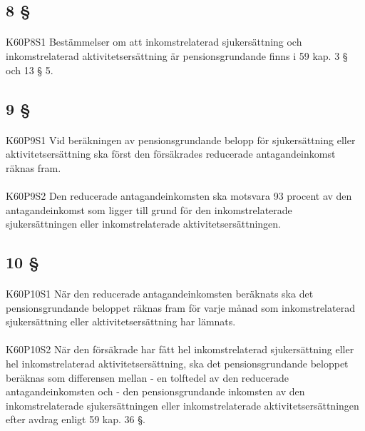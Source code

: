 \documentclass[a4paper,notitlepage,openany,10pt]{book}
\begin{document}
\subsection*{8 §}
\paragraph*{}
{\tiny K60P8S1}
Bestämmelser om att inkomstrelaterad sjukersättning och inkomstrelaterad aktivitetsersättning är pensionsgrundande finns i 59 kap. 3 § och 13 § 5.
\subsection*{9 §}
\paragraph*{}
{\tiny K60P9S1}
Vid beräkningen av pensionsgrundande belopp för sjukersättning eller aktivitetsersättning ska först den försäkrades reducerade antagandeinkomst räknas fram.
\paragraph*{}
{\tiny K60P9S2}
Den reducerade antagandeinkomsten ska motsvara 93 procent av den antagandeinkomst som ligger till grund för den inkomstrelaterade sjukersättningen eller inkomstrelaterade aktivitetsersättningen.
\subsection*{10 §}
\paragraph*{}
{\tiny K60P10S1}
När den reducerade antagandeinkomsten beräknats ska det pensionsgrundande beloppet räknas fram för varje månad som inkomstrelaterad sjukersättning eller aktivitetsersättning har lämnats.
\paragraph*{}
{\tiny K60P10S2}
När den försäkrade har fått hel inkomstrelaterad sjukersättning eller hel inkomstrelaterad aktivitetsersättning, ska det pensionsgrundande beloppet beräknas som differensen mellan
\newline - en tolftedel av den reducerade antagandeinkomsten och
\newline - den pensionsgrundande inkomsten av den inkomstrelaterade sjukersättningen eller inkomstrelaterade aktivitetsersättningen efter avdrag enligt 59 kap. 36 §.
\end{document}
